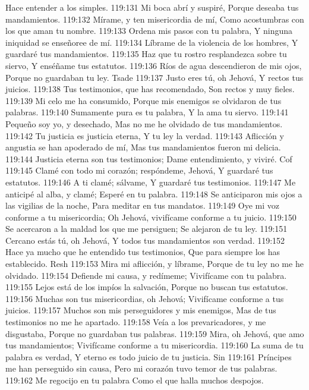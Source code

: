 Hace entender a los simples. 
119:131 Mi boca abrí y suspiré, 
Porque deseaba tus mandamientos. 
119:132 Mírame, y ten misericordia de mí, 
Como acostumbras con los que aman tu nombre. 
119:133 Ordena mis pasos con tu palabra, 
Y ninguna iniquidad se enseñoree de mí. 
119:134 Líbrame de la violencia de los hombres, 
Y guardaré tus mandamientos. 
119:135 Haz que tu rostro resplandezca sobre tu siervo, 
Y enséñame tus estatutos. 
119:136 Ríos de agua descendieron de mis ojos, 
Porque no guardaban tu ley. 
Tsade 
119:137 Justo eres tú, oh Jehová, 
Y rectos tus juicios. 
119:138 Tus testimonios, que has recomendado, 
Son rectos y muy fieles. 
119:139 Mi celo me ha consumido, 
Porque mis enemigos se olvidaron de tus palabras. 
119:140 Sumamente pura es tu palabra, 
Y la ama tu siervo. 
119:141 Pequeño soy yo, y desechado, 
Mas no me he olvidado de tus mandamientos. 
119:142 Tu justicia es justicia eterna, 
Y tu ley la verdad. 
119:143 Aflicción y angustia se han apoderado de mí, 
Mas tus mandamientos fueron mi delicia. 
119:144 Justicia eterna son tus testimonios; 
Dame entendimiento, y viviré. 
Cof 
119:145 Clamé con todo mi corazón; respóndeme, Jehová, 
Y guardaré tus estatutos. 
119:146 A ti clamé; sálvame, 
Y guardaré tus testimonios. 
119:147 Me anticipé al alba, y clamé; 
Esperé en tu palabra. 
119:148 Se anticiparon mis ojos a las vigilias de la noche, 
Para meditar en tus mandatos. 
119:149 Oye mi voz conforme a tu misericordia; 
Oh Jehová, vivifícame conforme a tu juicio. 
119:150 Se acercaron a la maldad los que me persiguen; 
Se alejaron de tu ley. 
119:151 Cercano estás tú, oh Jehová, 
Y todos tus mandamientos son verdad. 
119:152 Hace ya mucho que he entendido tus testimonios, 
Que para siempre los has establecido. 
Resh 
119:153 Mira mi aflicción, y líbrame, 
Porque de tu ley no me he olvidado. 
119:154 Defiende mi causa, y redímeme; 
Vivifícame con tu palabra. 
119:155 Lejos está de los impíos la salvación, 
Porque no buscan tus estatutos. 
119:156 Muchas son tus misericordias, oh Jehová; 
Vivifícame conforme a tus juicios. 
119:157 Muchos son mis perseguidores y mis enemigos, 
Mas de tus testimonios no me he apartado. 
119:158 Veía a los prevaricadores, y me disgustaba, 
Porque no guardaban tus palabras. 
119:159 Mira, oh Jehová, que amo tus mandamientos; 
Vivifícame conforme a tu misericordia. 
119:160 La suma de tu palabra es verdad, 
Y eterno es todo juicio de tu justicia. 
Sin 
119:161 Príncipes me han perseguido sin causa, 
Pero mi corazón tuvo temor de tus palabras. 
119:162 Me regocijo en tu palabra 
Como el que halla muchos despojos. 
